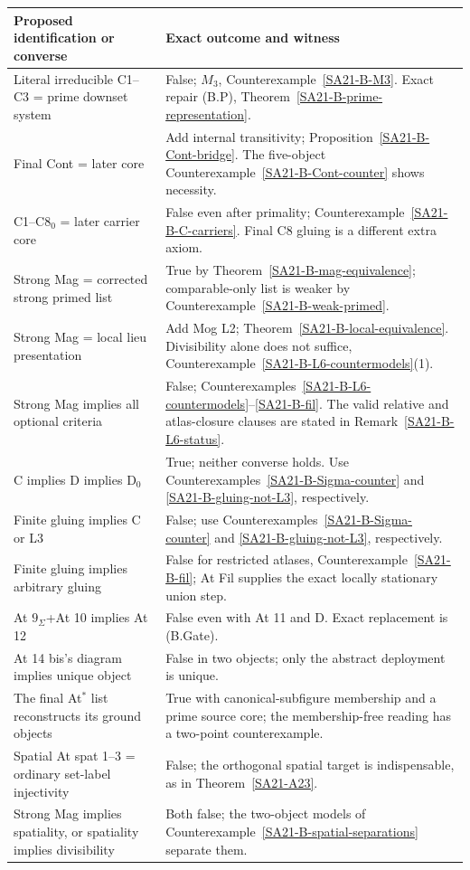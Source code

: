\begin{longtable}{p{.42\linewidth}p{.47\linewidth}}
\hline
Proposed identification or converse & Exact outcome and witness\\ \hline
Literal irreducible C1--C3 = prime downset system & False;
\(M_3\), Counterexample~\ref{SA21-B-M3}. Exact repair (B.P),
Theorem~\ref{SA21-B-prime-representation}.\\
Final Cont = later core & Add internal transitivity;
Proposition~\ref{SA21-B-Cont-bridge}. The five-object
Counterexample~\ref{SA21-B-Cont-counter} shows necessity.\\
C1--C8\(_0\) = later carrier core & False even after primality;
Counterexample~\ref{SA21-B-C-carriers}. Final C8 gluing is a
different extra axiom.\\
Strong Mag = corrected strong primed list & True by
Theorem~\ref{SA21-B-mag-equivalence}; comparable-only list
is weaker by Counterexample~\ref{SA21-B-weak-primed}.\\
Strong Mag = local lieu presentation & Add Mog L2;
Theorem~\ref{SA21-B-local-equivalence}. Divisibility alone
does not suffice, Counterexample~\ref{SA21-B-L6-countermodels}(1).\\
Strong Mag implies all optional criteria & False;
Counterexamples~\ref{SA21-B-L6-countermodels}--\ref{SA21-B-fil}.
The valid relative and atlas-closure clauses are stated in
Remark~\ref{SA21-B-L6-status}.\\
C implies D implies D\(_0\) & True; neither converse holds.
Use Counterexamples~\ref{SA21-B-Sigma-counter} and
\ref{SA21-B-gluing-not-L3}, respectively.\\
Finite gluing implies C or L3 & False; use
Counterexamples~\ref{SA21-B-Sigma-counter} and
\ref{SA21-B-gluing-not-L3}, respectively.\\
Finite gluing implies arbitrary gluing & False for restricted
atlases, Counterexample~\ref{SA21-B-fil}; At Fil supplies
the exact locally stationary union step.\\
At \(9_\Sigma\)+At 10 implies At 12 & False even with At 11
and D. Exact replacement is (B.Gate).\\
At 14 bis's diagram implies unique object & False in two
objects; only the abstract deployment is unique.\\
The final At\(^*\) list reconstructs its ground objects & True
with canonical-subfigure membership and a prime source core;
the membership-free reading has a two-point counterexample.\\
Spatial At spat 1--3 = ordinary set-label injectivity & False;
the orthogonal spatial target is indispensable, as in
Theorem~\ref{SA21-A23}.\\
Strong Mag implies spatiality, or spatiality implies divisibility &
Both false; the two-object models of
Counterexample~\ref{SA21-B-spatial-separations} separate them.\\ \hline
\end{longtable}

